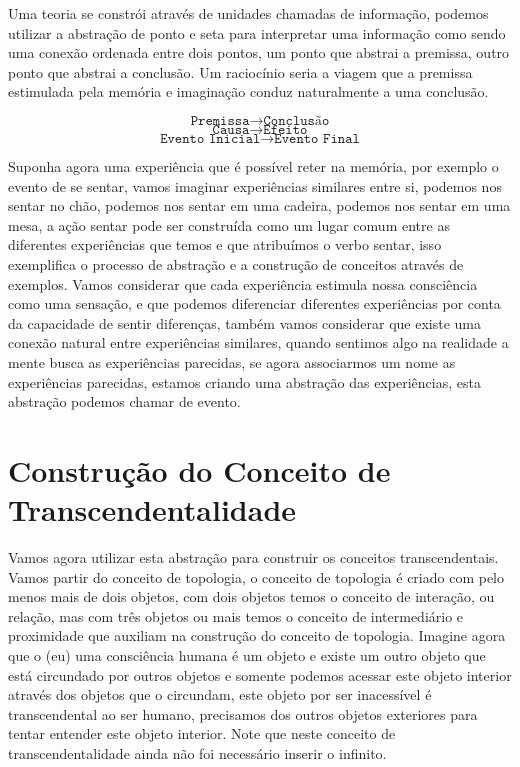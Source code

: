 \documentclass[10pt,a4paper]{report}
\begin{document}
Uma teoria se constrói através de unidades chamadas de informação, podemos utilizar a abstração de ponto e seta para interpretar uma informação como sendo uma conexão ordenada entre dois pontos, um ponto que abstrai a premissa, outro ponto que abstrai a conclusão. Um raciocínio seria a viagem que a premissa estimulada pela memória e imaginação conduz naturalmente a uma conclusão.

$$ \texttt{Premissa} \rightarrow \texttt{Conclusão} $$
$$ \texttt{Causa} \rightarrow \texttt{Efeito} $$
$$ \texttt{Evento Inicial} \rightarrow \texttt{Evento Final} $$


Suponha agora uma experiência que é possível reter na memória, por exemplo o evento de se sentar, vamos imaginar experiências similares entre si, podemos nos sentar no chão, podemos nos sentar em uma cadeira, podemos nos sentar em uma mesa, a ação sentar pode ser construída como um lugar comum entre as diferentes experiências que temos e que atribuímos o verbo sentar, isso exemplifica o processo de abstração e a construção de conceitos através de exemplos. Vamos considerar que cada experiência estimula nossa consciência como uma sensação, e que podemos diferenciar diferentes experiências por conta da capacidade de sentir diferenças, também vamos considerar que existe uma conexão natural entre experiências similares, quando sentimos algo na realidade a mente busca as experiências parecidas, se agora associarmos um nome as experiências parecidas, estamos criando uma abstração das experiências, esta abstração podemos chamar de evento.

\section{Construção do Conceito de Transcendentalidade}

\hspace{\baselineskip}

Vamos agora utilizar esta abstração para construir os conceitos transcendentais. Vamos partir do conceito de topologia, o conceito de topologia é criado com pelo menos mais de dois objetos, com dois objetos temos o conceito de interação, ou relação, mas com três objetos ou mais temos o conceito de intermediário e proximidade que auxiliam na construção do conceito de topologia. Imagine agora que o (eu) uma consciência humana é um objeto e existe um outro objeto que está circundado por outros objetos e somente podemos acessar este objeto interior através dos objetos que o circundam, este objeto por ser inacessível é transcendental ao ser humano, precisamos dos outros objetos exteriores para tentar entender este objeto interior. Note que neste conceito de transcendentalidade ainda não foi necessário inserir o infinito.
\end{document}
